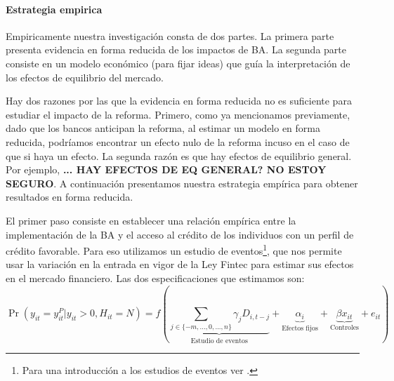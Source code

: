 \documentclass[11pt]{article}
\theoremstyle{plain}
\theoremstyle{plain}
\begin{document}
 

\paragraph{Estrategia empirica}

Empiricamente nuestra investigación consta de dos partes. La primera parte presenta evidencia en forma reducida de los impactos de BA. La segunda parte consiste en un modelo económico (para fijar ideas) que guía la interpretación de los efectos de equilibrio del mercado.

Hay dos razones por las que la evidencia en forma reducida no es suficiente para estudiar el impacto de la reforma. Primero, como ya mencionamos previamente, dado que los bancos anticipan la reforma, al estimar un modelo en forma reducida, podríamos encontrar un efecto nulo  de la reforma incuso en el caso de que si haya un efecto. La segunda razón es que hay efectos de equilibrio general. Por ejemplo, \textbf{... HAY EFECTOS DE EQ GENERAL? NO ESTOY SEGURO}. A continuación presentamos nuestra estrategia empírica para obtener resultados en forma reducida. 

El primer paso consiste en establecer una relación empírica entre la implementación de la BA y el acceso al crédito de los individuos con un perfil de crédito favorable. Para eso utilizamos un estudio de eventos\footnote{Para una introducción a los estudios de eventos ver \textcite{miller_introductory_2023}.},  que nos permite usar la variación en la entrada en vigor de la Ley Fintec para estimar sus efectos en el mercado financiero. Las dos especificaciones que estimamos son: 
\begin{equation}
    \Pr(y_{it}=y_{it}^P|y_{it} > 0, H_{it}= N) = f\left( 
    \underbrace{\sum_{j\in \{-m,..., 0,...,n\}}\gamma_j D_{i,t-j}}_{\text{Estudio de eventos}} +
    \underbrace{\alpha_i 
    }_{\text{Efectos fijos}} +
    \underbrace{\beta x_{it}}_{\text{Controles}} + e_{it}\right) 
    \label{eqn:main_linear_model}
\end{equation}
\end{document}
